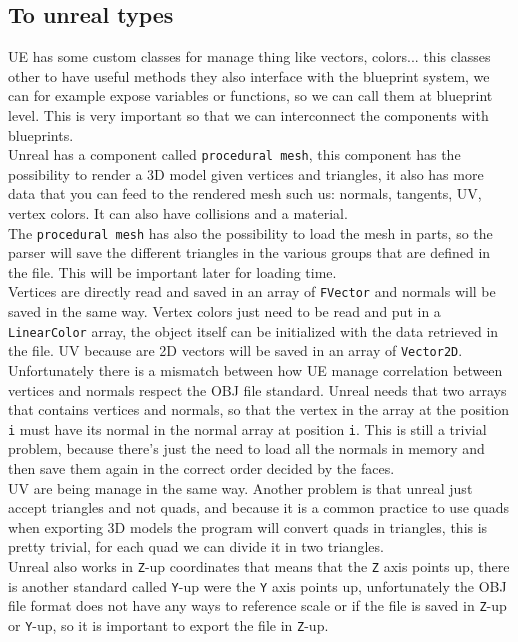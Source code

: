 \subsection{To unreal types}
\noindent
\ac{UE} has some custom classes for manage thing like vectors, colors... this classes other to have useful methods they also interface with the blueprint system, we can for example expose variables or functions, so we can call them at blueprint level.
This is very important so that we can interconnect the \cpp components with blueprints.\\
Unreal has a component called \verb|procedural mesh|, this component has the possibility to render a 3D model given vertices and triangles, it also has more data that you can feed to the rendered mesh such us: normals, tangents, UV, vertex colors.
It can also have collisions and a material.\\
The \verb|procedural mesh| has also the possibility to load the mesh in parts, so the parser will save the different triangles in the various groups that are defined in the file.
This will be important later for loading time.\\
Vertices are directly read and saved in an array of \verb|FVector| and normals will be saved in the same way.
Vertex colors just need to be read and put in a \verb|LinearColor| array, the object itself can be initialized with the data retrieved in the file.
UV because are 2D vectors will be saved in an array of \verb|Vector2D|.
Unfortunately there is a mismatch between how \ac{UE} manage correlation between vertices and normals respect the OBJ file standard.
Unreal needs that two arrays that contains vertices and normals, so that the vertex in the array at the position \verb|i| must have its normal in the normal array at position \verb|i|. 
This is still a trivial problem, because there's just the need to load all the normals in memory and then save them again in the correct order decided by the faces.\\
UV are being manage in the same way.
Another problem is that unreal just accept triangles and not quads, and because it is a common practice to use quads when exporting 3D models the program will convert quads in triangles, this is pretty trivial, for each quad we can divide it in two triangles.\\
Unreal also works in \verb|Z|-up coordinates that means that the \verb|Z| axis points up, there is another standard called \verb|Y|-up were the \verb|Y| axis points up, unfortunately the OBJ file format does not have any ways to reference scale or if the file is saved in \verb|Z|-up or \verb|Y|-up,
so it is important to export the file in \verb|Z|-up.\\

